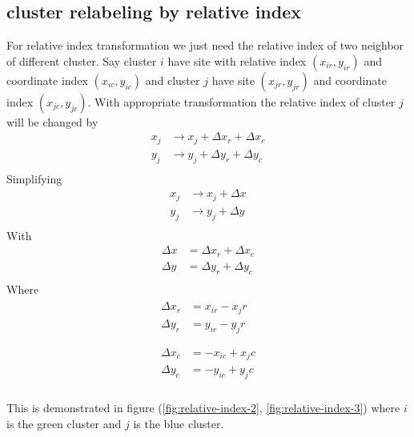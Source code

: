 \documentclass[10pt,a4paper]{report}
\begin{document}
\subsection{cluster relabeling by relative index}
For relative index transformation we just need the relative index of two neighbor of different cluster. Say cluster $i$ have site with relative index $(x_{ir},y_{ir})$  and coordinate index $(x_{ic},y_{ic})$ and cluster $j$ have site $(x_{jr},y_{jr})$ and coordinate index $(x_{jc},y_{jc})$.
With appropriate transformation the relative index of cluster $j$ will be changed by
\begin{equation}
\begin{split}
	x_j &\rightarrow x_j + \Delta x_r + \Delta x_c \\
	y_j &\rightarrow y_j + \Delta y_r + \Delta y_c \\
\end{split}
\end{equation}
Simplifying
\begin{equation}
\begin{split}
	x_j &\rightarrow x_j + \Delta x \\
	y_j &\rightarrow y_j + \Delta y \\
\end{split}
\end{equation}
With
\begin{equation}
\begin{split}
\Delta x &= \Delta x_r + \Delta x_c  \\
\Delta y &= \Delta y_r + \Delta y_c  \\
\end{split}
\end{equation}
Where
\begin{align}
\begin{split}
\Delta x_r &= x_{ir}-{x_jr}  \\
\Delta y_r &= y_{ir}-{y_jr}  \\
\end{split}
\\
\begin{split}
\Delta x_c &= -x_{ic}+{x_jc} \\
\Delta y_c &= -y_{ic}+{y_jc}  \\
\end{split}
\end{align}

This is demonstrated in figure (\ref{fig:relative-index-2}, \ref{fig:relative-index-3}) where $i$ is the green cluster and $j$ is the blue cluster. 
\end{document}
